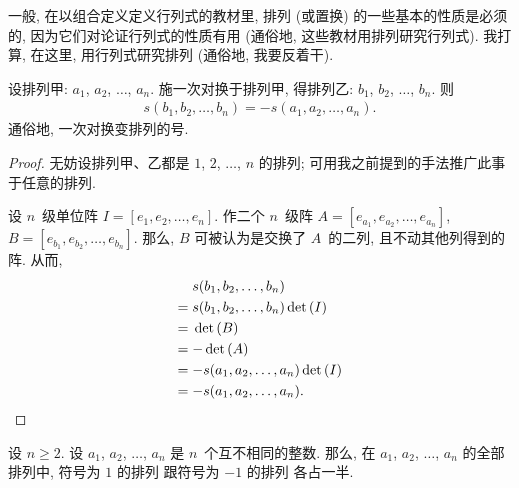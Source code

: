 \documentclass[%
    UTF8,%
    fontset=none,%
    punct=kaiming,%
    zihao=-4,%
    a4paper,%
    oneside,%
]{ctexbook}
\renewcommand*{\geq}{\geqslant}
\begin{document}
一般, 在以组合定义定义行列式的教材里,
排列 (或置换) 的一些基本的性质是必须的,
因为它们对论证行列式的性质有用
(通俗地, 这些教材用排列研究行列式).
我打算, 在这里, 用行列式研究排列
(通俗地, 我要反着干).

\begin{theorem}
    设排列甲: \(a_1\), \(a_2\), \(\dots\), \(a_n\).
    施一次对换于排列甲,
    得排列乙: \(b_1\), \(b_2\), \(\dots\), \(b_n\).
    则
    \begin{align*}
        s(b_1, b_2, \dots, b_n) = -s(a_1, a_2, \dots, a_n).
    \end{align*}
    通俗地, 一次对换变排列的号.
\end{theorem}

\begin{proof}
    无妨设排列甲、乙都是
    \(1\), \(2\), \(\dots\), \(n\) 的排列;
    可用我之前提到的手法推广此事于任意的排列.

    设 \(n\)~级单位阵
    \(I = [e_1, e_2, \dots, e_n]\).
    作二个 \(n\)~级阵
    \(A = [e_{a_1}, e_{a_2}, \dots, e_{a_n}]\),
    \(B = [e_{b_1}, e_{b_2}, \dots, e_{b_n}]\).
    那么, \(B\) 可被认为是交换了 \(A\)~的二列,
    且不动其他列得到的阵.
    从而,
    \begin{align*}
             & s(b_1, b_2, \dots, b_n)
        \\
        = {} & s(b_1, b_2, \dots, b_n) \det {(I)}
        \\
        = {} & \det {(B)}
        \\
        = {} & {-\det {(A)}}
        \\
        = {} & {-s(a_1, a_2, \dots, a_n)} \det {(I)}
        \\
        = {} & {-s(a_1, a_2, \dots, a_n)}.
        \qedhere
    \end{align*}
\end{proof}

\begin{theorem}
    设 \(n \geq 2\).
    设 \(a_1\), \(a_2\), \(\dots\), \(a_n\) 是
    \(n\)~个互不相同的整数.
    那么, 在
    \(a_1\), \(a_2\), \(\dots\), \(a_n\) 的全部排列中,
    符号为 \(1\) 的排列%
    跟符号为 \(-1\) 的排列%
    各占一半.
\end{theorem}
\end{document}
